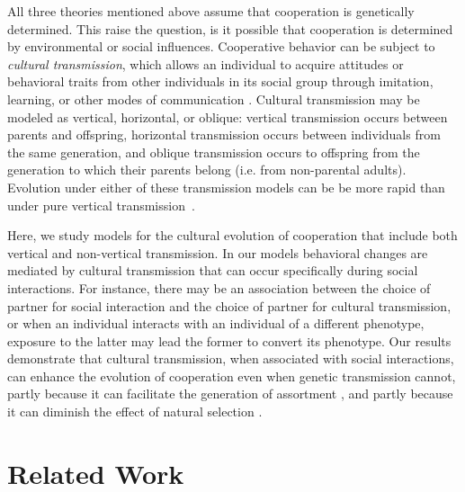 \documentclass[12pt]{extarticle}
\begin{document}
All three theories mentioned above assume that cooperation is genetically determined. This raise the question, is it possible that cooperation is determined by environmental or social influences.
Cooperative behavior can be subject to \emph{cultural transmission}, which allows an individual to acquire attitudes or behavioral traits from other individuals in its social group through imitation, learning, or other modes of communication \citep{cavalli1981cultural,richerson2008not}.
Cultural transmission may be  modeled as vertical, horizontal, or oblique:  vertical transmission occurs between parents and offspring, horizontal transmission occurs between individuals from the same generation, and oblique transmission occurs  to offspring from the generation to which their parents belong (i.e. from non-parental adults). 
Evolution under either of these transmission models can be be more rapid than under pure vertical transmission~\citep{cavalli1981cultural,lycett2008questions,ram2018evolution}.

Here, we study models for the cultural evolution of cooperation that include both vertical and non-vertical transmission. 
In our models behavioral changes are mediated by cultural transmission that can occur specifically during social interactions.
For instance, there may be an association between the choice of partner for social interaction and the choice of partner for cultural transmission,
or when an individual interacts with an individual of a different phenotype,  exposure to the latter may lead the former to  convert its phenotype.
Our results demonstrate that cultural transmission, when associated with social interactions, can enhance the evolution of cooperation even when genetic transmission cannot, partly because it can facilitate the generation of assortment \citep{Fletcher2009assortment}, and partly because it can diminish the effect of natural selection \citep{ram2018evolution}.

\newpage
\section{Related Work}
\end{document}
